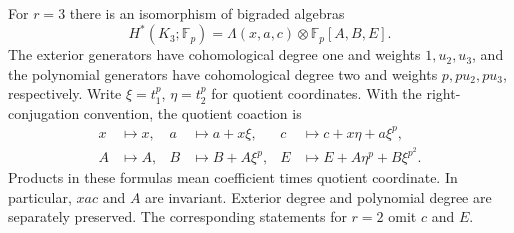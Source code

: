 \begin{lemma}\label{frob:action}
For $r=3$ there is an isomorphism of bigraded algebras
\begin{equation}\label{frob:kernel-cohomology}
 H^*(K_3;\mathbb F_p)
   =\Lambda(x,a,c)\otimes\mathbb F_p[A,B,E].
\end{equation}
The exterior generators have cohomological degree one and weights
$1,u_2,u_3$, and the polynomial generators have cohomological degree
two and weights $p,pu_2,pu_3$, respectively.  Write
$\xi=t_1^p$, $\eta=t_2^p$ for quotient coordinates.  With the
right-conjugation convention, the quotient coaction is
\begin{align}
 x&\longmapsto x,&
 a&\longmapsto a+x\xi,&
 c&\longmapsto c+x\eta+a\xi^p,\label{frob:exterior-action}\\
 A&\longmapsto A,&
 B&\longmapsto B+A\xi^p,&
 E&\longmapsto E+A\eta^p+B\xi^{p^2}.
 \label{frob:polynomial-action}
\end{align}
Products in these formulas mean coefficient times quotient coordinate.
In particular, $xac$ and $A$ are invariant.  Exterior degree and
polynomial degree are separately preserved.  The corresponding
statements for $r=2$ omit $c$ and $E$.
\end{lemma}

